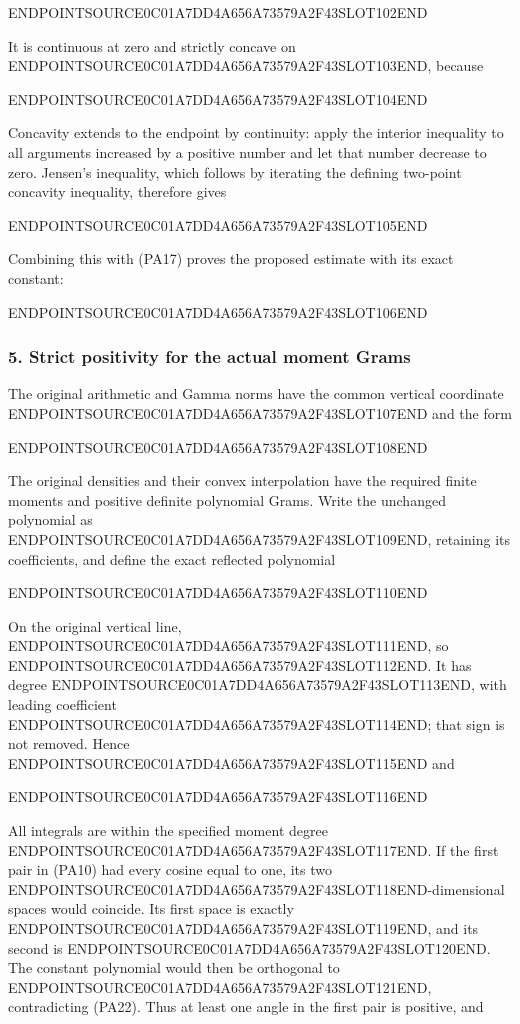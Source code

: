 ENDPOINTSOURCE0C01A7DD4A656A73579A2F43SLOT102END

It is continuous at zero and strictly concave on ENDPOINTSOURCE0C01A7DD4A656A73579A2F43SLOT103END, because

ENDPOINTSOURCE0C01A7DD4A656A73579A2F43SLOT104END

Concavity extends to the endpoint by continuity: apply the interior inequality to all arguments increased by a positive number and let that number decrease to zero. Jensen's inequality, which follows by iterating the defining two-point concavity inequality, therefore gives

ENDPOINTSOURCE0C01A7DD4A656A73579A2F43SLOT105END

Combining this with (PA17) proves the proposed estimate with its exact constant:

ENDPOINTSOURCE0C01A7DD4A656A73579A2F43SLOT106END

\subsubsection{5. Strict positivity for the actual moment Grams}\label{endpoint-principal_angle_volume_review--strict-positivity-for-the-actual-moment-grams}

The original arithmetic and Gamma norms have the common vertical coordinate ENDPOINTSOURCE0C01A7DD4A656A73579A2F43SLOT107END and the form

ENDPOINTSOURCE0C01A7DD4A656A73579A2F43SLOT108END

The original densities and their convex interpolation have the required finite moments and positive definite polynomial Grams. Write the unchanged polynomial as ENDPOINTSOURCE0C01A7DD4A656A73579A2F43SLOT109END, retaining its coefficients, and define the exact reflected polynomial

ENDPOINTSOURCE0C01A7DD4A656A73579A2F43SLOT110END

On the original vertical line, ENDPOINTSOURCE0C01A7DD4A656A73579A2F43SLOT111END, so ENDPOINTSOURCE0C01A7DD4A656A73579A2F43SLOT112END. It has degree ENDPOINTSOURCE0C01A7DD4A656A73579A2F43SLOT113END, with leading coefficient ENDPOINTSOURCE0C01A7DD4A656A73579A2F43SLOT114END; that sign is not removed. Hence ENDPOINTSOURCE0C01A7DD4A656A73579A2F43SLOT115END and

ENDPOINTSOURCE0C01A7DD4A656A73579A2F43SLOT116END

All integrals are within the specified moment degree ENDPOINTSOURCE0C01A7DD4A656A73579A2F43SLOT117END. If the first pair in (PA10) had every cosine equal to one, its two ENDPOINTSOURCE0C01A7DD4A656A73579A2F43SLOT118END-dimensional spaces would coincide. Its first space is exactly ENDPOINTSOURCE0C01A7DD4A656A73579A2F43SLOT119END, and its second is ENDPOINTSOURCE0C01A7DD4A656A73579A2F43SLOT120END. The constant polynomial would then be orthogonal to ENDPOINTSOURCE0C01A7DD4A656A73579A2F43SLOT121END, contradicting (PA22). Thus at least one angle in the first pair is positive, and

